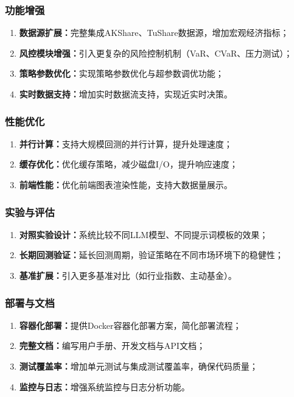 \documentclass[12pt,a4paper]{ctexart}
\begin{document}
\subsubsection{功能增强}

\begin{enumerate}
    \item \textbf{数据源扩展：}完整集成AKShare、TuShare数据源，增加宏观经济指标；
    \item \textbf{风控模块增强：}引入更复杂的风险控制机制（VaR、CVaR、压力测试）；
    \item \textbf{策略参数优化：}实现策略参数优化与超参数调优功能；
    \item \textbf{实时数据支持：}增加实时数据流支持，实现近实时决策。
\end{enumerate}

\subsubsection{性能优化}

\begin{enumerate}
    \item \textbf{并行计算：}支持大规模回测的并行计算，提升处理速度；
    \item \textbf{缓存优化：}优化缓存策略，减少磁盘I/O，提升响应速度；
    \item \textbf{前端性能：}优化前端图表渲染性能，支持大数据量展示。
\end{enumerate}

\subsubsection{实验与评估}

\begin{enumerate}
    \item \textbf{对照实验设计：}系统比较不同LLM模型、不同提示词模板的效果；
    \item \textbf{长期回测验证：}延长回测周期，验证策略在不同市场环境下的稳健性；
    \item \textbf{基准扩展：}引入更多基准对比（如行业指数、主动基金）。
\end{enumerate}

\subsubsection{部署与文档}

\begin{enumerate}
    \item \textbf{容器化部署：}提供Docker容器化部署方案，简化部署流程；
    \item \textbf{完整文档：}编写用户手册、开发文档与API文档；
    \item \textbf{测试覆盖率：}增加单元测试与集成测试覆盖率，确保代码质量；
    \item \textbf{监控与日志：}增强系统监控与日志分析功能。
\end{enumerate}
\end{document}

